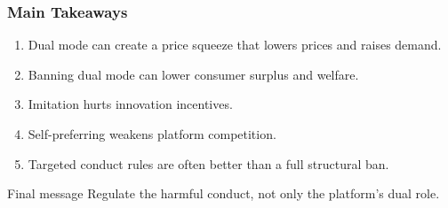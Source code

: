 \begin{frame}
  \frametitle{Main Takeaways}
  \small
  \begin{enumerate}
    \item Dual mode can create a price squeeze that lowers prices and raises demand.
    \item Banning dual mode can lower consumer surplus and welfare.
    \item Imitation hurts innovation incentives.
    \item Self-preferring weakens platform competition.
    \item Targeted conduct rules are often better than a full structural ban.
  \end{enumerate}

  \begin{alertblock}{Final message}
    Regulate the harmful conduct, not only the platform's dual role.
  \end{alertblock}
\end{frame}
